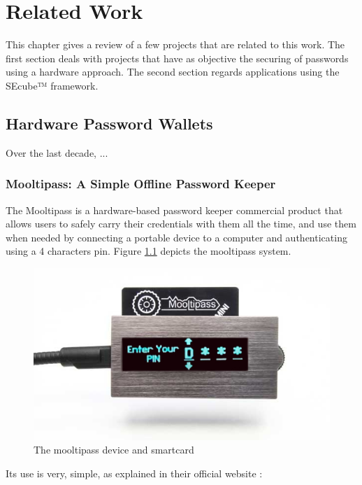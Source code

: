 \chapter{Related Work}

This chapter gives a review of a few projects that are related to this work. The first section deals with projects that have as objective the securing of passwords using a hardware approach. The second section regards applications using the SEcube™ framework.

\section {Hardware Password Wallets}
Over the last decade, ... 

\subsection {Mooltipass: A Simple Offline Password Keeper} 

The Mooltipass is a hardware-based password keeper commercial product that allows users to safely carry their credentials with them all the time, and use them when needed by connecting a portable device to a computer and authenticating using a 4 characters pin. 
Figure \ref{fig:mool} depicts the mooltipass system.

\begin{figure}[htb]
  \centering
  \captionsetup{justification=centering}
  \centerline{\includegraphics[width=0.6\columnwidth]{chapters/figures/related/mooltipass.jpg}}
  \caption{The mooltipass device and smartcard}
  \label{fig:mool}
\end{figure}

Its use is very, simple, as explained in their official website \cite{mooltipass}:

